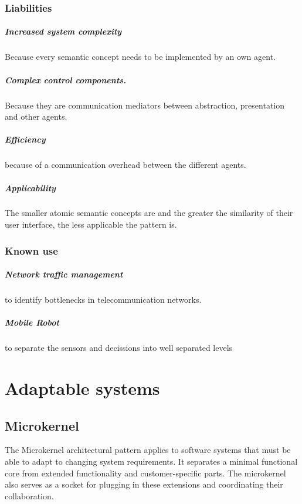 \documentclass[a4paper,11pt,twocolumn]{report}
\begin{document}
    \subsection{Liabilities}
    \paragraph{Increased system complexity}
    Because every semantic concept needs to be implemented by an own agent.
    \paragraph{Complex control components.} Because they are communication
    mediators between abstraction, presentation and other agents.
    \paragraph{Efficiency} because of a communication overhead between the
    different agents.
    \paragraph{Applicability} The smaller atomic semantic concepts are and the
    greater the similarity of their user interface, the less applicable the
    pattern is.
    \subsection{Known use}
    \paragraph{Network traffic management} to identify bottlenecks in
    telecommunication networks.
    \paragraph{Mobile Robot} to separate the sensors and decissions into well
    separated levels
    
    
    \chapter{Adaptable systems}

    \section{Microkernel}
    The Microkernel architectural pattern applies to software systems that must
    be able to adapt to changing system requirements. It separates a minimal
    functional core from extended functionality and customer-specific parts.
    The microkernel also serves as a socket for plugging in these extensions
    and coordinating their collaboration.
\end{document}
